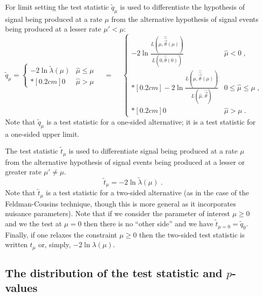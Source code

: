 For limit setting the test statistic $\tilde{q}_{\mu}$ is used to differentiate the hypothesis of signal being produced at a rate $\mu$ from the alternative hypothesis of signal events being produced at a lesser rate $\mu'<\mu$:
\begin{equation}
\label{eq:qmutilde}  
\tilde{q}_{\mu} =  \left\{ \!
\! \begin{array}{ll} - 2 \ln \tilde{\lambda}(\mu)  & \hat{\mu} \le \mu
\\*[0.2 cm] 0 & \hat{\mu} > \mu 
              \end{array} \right.  \quad = \quad \: \left\{ \!
\! \begin{array}{lll} - 2 \ln \frac{L(\mu,
\hat{\hat{\vec{\theta}}}(\mu))} {L(0, \hat{\hat{\theta}}(0))}   &
\hat{\mu} < 0 \;, \\*[0.2 cm] -2 \ln \frac{L(\mu,
\hat{\hat{\vec{\theta}}}(\mu))} {L(\hat{\mu}, \hat{\vec{\theta}})} &
0 \le \hat{\mu} \le \mu  \;, \\*[0.2 cm] 0 & \hat{\mu} > \mu \;.
              \end{array} \right.
\end{equation}
Note that $\tilde{q}_{\mu}$ is a test statistic for a one-sided alternative; it is a test statistic for a one-sided upper limit. 


The test statistic $\tilde{t}_\mu$ is used to differentiate signal being produced at a rate $\mu$ from the alternative hypothesis of signal events being produced at a lesser or greater rate $\mu' \ne\mu$.
\begin{equation}
\label{eq:tmu}
\tilde{t}_{\mu} =  - 2 \ln \tilde{\lambda}(\mu)   \; .  
\end{equation}
Note that $\tilde{t}_\mu$ is a test statistic for a two-sided alternative (as in the case of the Feldman-Cousins technique, though this is more general as it incorporates nuisance parameters).  Note  that if we consider the parameter of interest $\mu\ge 0$ and we the test at $\mu=0$ then there is no ``other side'' and we have $\tilde{t}_{\mu=0} = \tilde{q}_0$.  Finally, if one relaxes the constraint $\mu\ge0$ then the two-sided test statistic is written $t_\mu$ or, simply, $-2\ln\lambda(\mu)$.


\subsection{The distribution of the test statistic and $p$-values}


